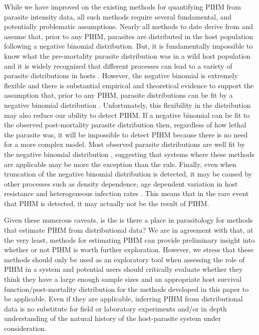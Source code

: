 \documentclass[12pt, a4paper]{article}
\begin{document}
While we have improved on the existing methods for quantifying
PIHM from parasite intensity data, all such methods require several
fundamental, and potentially problematic assumptions.  Nearly all methods to date derive from \cite[][but see \cite{Ferguson2011}]{Crofton1971a} and assume that, prior to any PIHM, parasites are distributed in the host population following a
negative binomial distribution. But, it is fundamentally impossible to know
what the pre-mortality parasite distribution was in a wild host population and
it is widely recognized that different processes can lead to a variety of
parasite distributions in hosts \citep{Anderson1982a, Duerr2003}. However, the negative binomial is extremely
flexible and there is substantial empirical and theoretical evidence to support
the assumption that, prior to any PIHM, parasite distributions can be fit by a negative binomial distribution \citep{Shaw1995,Shaw1998,Wilson2002}. Unfortunately, this
flexibility in the distribution may also reduce our ability to detect PIHM. If
a negative binomial can be fit to the observed post-mortality parasite
distribution then, regardless of how lethal the parasite was, it will be
impossible to detect PIHM because there is no need for a more complex model.
Most observed parasite distributions are well fit by the negative binomial distribution \citep{Shaw1998}, suggesting
that systems where these methods are applicable may be more the exception than
the rule.  Finally, even when truncation of the negative binomial distribution is detected, it may be caused by other
processes such as density dependence, age dependent variation in host
resistance and heterogeneous infection rates \citep{McCallum2000a,Anderson1982a,Rousset1996}.  This means that in the rare event
that PIHM is detected, it may actually not be the result of PIHM.

Given these numerous caveats, is the is there a place in parasitology for methods that
estimate PIHM from distributional data?  We are in agreement with
\cite{Lester1984} that, at the very least, methods for estimating PIHM can
provide preliminary insight into whether or not PIHM is worth further
exploration.  However, we stress that these methods should only be used as an
exploratory tool when assessing the role of PIHM in a system and potential
users should critically evaluate whether they think they have a large enough
sample sizes and an appropriate host survival function/post-mortality distribution for the methods developed
in this paper to be applicable.  Even if they are applicable, inferring PIHM
from distributional data is no substitute for field or laboratory experiments
and/or in depth understanding of the natural history of the host-parasite
system under consideration.
\end{document}
